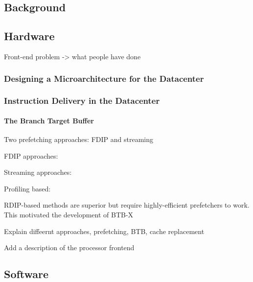 \documentclass[../main.tex]{subfiles}
\begin{document}
\ifx\chapincluded\undefined
  \begin{refsection}
 \fi


\chapter{Background}
\label{chap:background}

\section{Hardware}

Front-end problem -> what people have done

\subsection{Designing a Microarchitecture for the Datacenter}
\cite{kanev15_profil,ferdman12_clear_cloud}


\subsection{Instruction Delivery in the Datacenter}

\subsubsection{The Branch Target Buffer}
\label{chap:btb-hebackground}

Two prefetching approaches: FDIP and streaming


FDIP approaches: \cite{reinman99_fetch_direc_instr_prefet, kumar17_boomer,kumar18_blast_throug_front_end_bottl_with_shotg,kumar20_shoot_down_server_front_end_bottl}

Streaming approaches:
\cite{ferdman08_tempor,ferdman11_proac_instr_fetch,kaynak13_shift,kaynak15_confl}

Profiling based:

RDIP-based methods are superior but require highly-efficient prefetchers to work. This motivated the development of BTB-X

Explain diffeernt approaches, prefetching, BTB, cache replacement

Add a description of the processor frontend

\section{Software}


\end{refsection}
\end{document}
